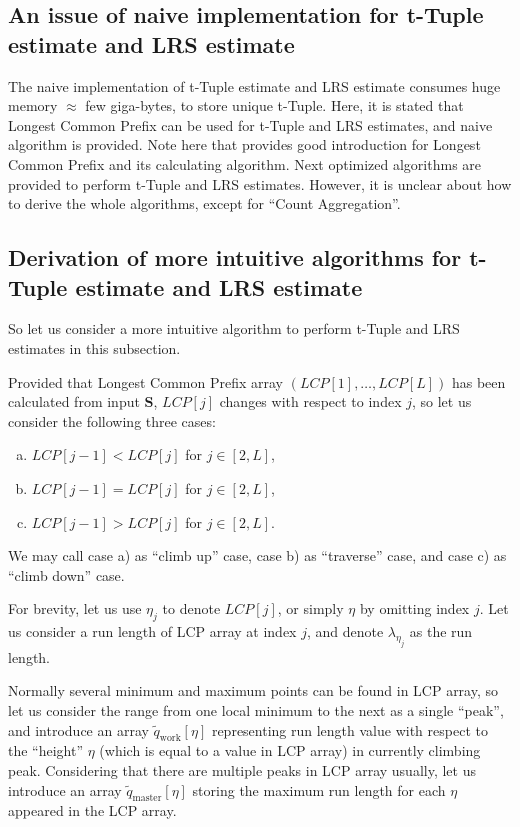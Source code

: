 ﻿\documentclass[a3paper,xelatex,english]{bxjsarticle}
\newcommand\mib[1]{\boldsymbol{#1}}
\begin{document}
\subsection{An issue of naive implementation for t-Tuple estimate and LRS estimate}
The naive implementation of t-Tuple estimate and LRS estimate consumes huge memory $\approx$ few giga-bytes, to store unique t-Tuple. 
Here, it is stated that Longest Common Prefix can be used for t-Tuple and LRS estimates, and naive algorithm is provided\cite{JoshaHill}.
Note here that \cite{MIT} provides good introduction for Longest Common Prefix and its calculating algorithm.
Next optimized algorithms are provided to perform t-Tuple and LRS estimates\cite{Kaufer}.
However, it is unclear about how to derive the whole algorithms, except for ``Count Aggregation''.


\subsection{Derivation of more intuitive algorithms for t-Tuple estimate and LRS estimate}
So let us consider a more intuitive algorithm to perform t-Tuple and LRS estimates in this subsection.

Provided that Longest Common Prefix array $(LCP[1], \ldots, LCP[L])$ has been calculated from input $\mib{S}$, 
$LCP[j]$ changes with respect to index $j$, so let us consider the following three cases: 
\begin{enumerate}[a)]
	\item $LCP[j - 1] < LCP[j]$ \qquad for $j \in [2, L]$,
	\item $LCP[j - 1] = LCP[j]$ \qquad for $j \in [2, L]$,
	\item $LCP[j - 1] > LCP[j]$ \qquad for $j \in [2, L]$.
\end{enumerate}

We may call case a) as ``climb up'' case, case b) as ``traverse'' case, and case c) as ``climb down'' case.

For brevity, let us use $\eta_{j}$ to denote $LCP[j]$,  or simply $\eta$ by omitting index $j$.
Let us consider a run length of LCP array at index $j$, and denote $\lambda_{\eta_{j}}$ as the run length.

Normally several minimum and maximum points can be found in LCP array, 
so let us consider the range from one local minimum to the next as a single ``peak'', and introduce an array $\tilde{q}_{\textrm{work}}[\eta]$ representing run length value with respect to the ``height'' $\eta$ (which is equal to a value in LCP array) in currently climbing peak.
Considering that there are multiple peaks in LCP array usually, let us introduce an array $\tilde{q}_{\textrm{master}}[\eta]$ storing the maximum run length for each $\eta$ appeared in the LCP array.
\end{document}
